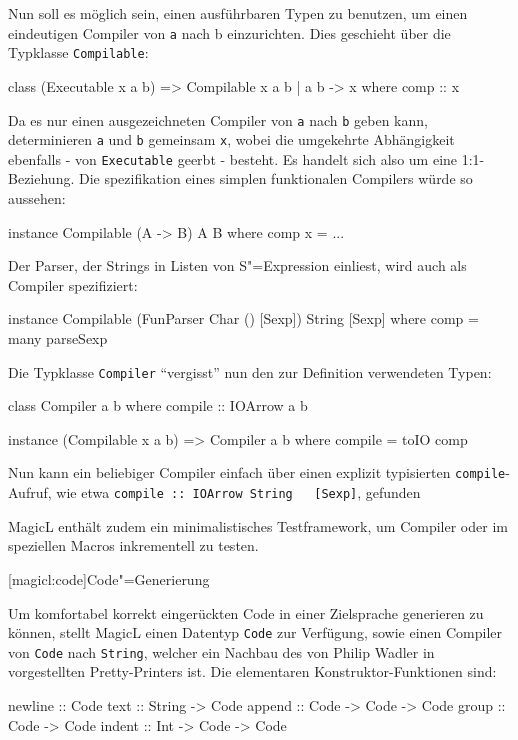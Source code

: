 \documentclass[a4paper, bibgerm]{book}
\newcommand\icode[1]{\lstinline?#1?}
\newcommand\lsection{}
\newcommand{\sexp}{S"=Expression}
\newcommand{\cgen}{Code"=Generierung}
\begin{document}
Nun soll es möglich sein, einen ausführbaren Typen zu benutzen, um einen
eindeutigen Compiler von \icode{a} nach {b} einzurichten. Dies geschieht
über die Typklasse \icode{Compilable}:
\begin{code}
class (Executable x a b) => Compilable x a b | a b -> x where
  comp :: x
\end{code}
Da es nur einen ausgezeichneten Compiler von \icode{a} nach \icode{b}
geben kann, determinieren \icode{a} und \icode{b} gemeinsam \icode{x},
wobei die umgekehrte Abhängigkeit ebenfalls - von \icode{Executable}
geerbt - besteht. Es handelt sich also um eine 1:1-Beziehung. Die
spezifikation eines simplen funktionalen Compilers würde so aussehen:
\begin{code}
instance Compilable (A -> B) A B where
  comp x = ...
\end{code}
Der Parser, der Strings in Listen von \sexp{} einliest, wird auch als
Compiler spezifiziert:
\begin{code}
instance Compilable (FunParser Char () [Sexp]) String [Sexp] where
  comp = many parseSexp
\end{code}
Die Typklasse \icode{Compiler} "`vergisst"' nun den zur Definition
verwendeten Typen:
\begin{code}
class Compiler a b where
  compile :: IOArrow a b

instance (Compilable x a b) => Compiler a b where
  compile = toIO comp
\end{code}
Nun kann ein beliebiger Compiler einfach über einen explizit typisierten
\icode{compile}-Aufruf, wie etwa \icode{compile :: IOArrow String
  [Sexp]}, gefunden

MagicL enthält zudem ein minimalistisches Testframework, um Compiler
oder im speziellen Macros inkrementell zu testen.

\lsection[magicl:code]{\cgen{}}

Um komfortabel korrekt eingerückten Code in einer Zielsprache generieren
zu können, stellt MagicL einen Datentyp \icode{Code} zur Verfügung,
sowie einen Compiler von \icode{Code} nach \icode{String}, welcher ein
Nachbau des von Philip Wadler in \cite[S.223ff]{FunOfProgramming}
vorgestellten Pretty-Printers ist. Die elementaren
Konstruktor-Funktionen sind:
\begin{code}
newline :: Code
text    :: String -> Code
append  :: Code   -> Code -> Code
group   :: Code   -> Code
indent  :: Int    -> Code -> Code
\end{code}
\end{document}
